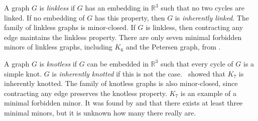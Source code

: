 A graph $G$ is \textit{linkless} if $G$ has an embedding in $\mathbb{R}^3$ such that no two cycles are linked. If no embedding of $G$ has this property, then $G$ is \textit{inherently linked}. The family of linkless graphs is minor-closed. If $G$ is linkless, then contracting any edge maintains the linkless property. There are only seven minimal forbidden minors of linkless graphs, including $K_6$ and the Petersen graph, from \textcite{robertsonSachsLinklessEmbedding1995}. 

A graph $G$ is \textit{knotless} if $G$ can be embedded in $\mathbb{R}^3$ such that every cycle of $G$ is a simple knot. $G$ is \textit{inherently knotted} if this is not the case.\ \textcite{conwayKnotsLinksSpatial1983} showed that $K_7$ is inherently knotted. The family of knotless graphs is also minor-closed, since contracting any edge preserves the knotless property. $K_7$ is an example of a minimal forbidden minor. It was found by \textcite{conwayKnotsLinksSpatial1983} and \textcite{foisyIntrinsicallyKnottedGraphs2002,foisyNewlyRecognizedIntrinsically2003} that there exists at least three minimal minors, but it is unknown how many there really are.
